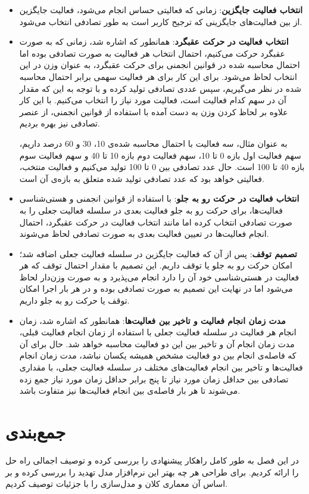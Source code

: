 \begin{itemize}
\item \textbf{انتخاب فعالیت جایگزین}: زمانی که فعالیتی حساس انجام می‌شود، فعالیت جایگزین از بین فعالیت‌های جایگزینی که ترجیح کاربر است به طور تصادفی انتخاب می‌شود.
\item \textbf{انتخاب فعالیت در حرکت عقبگرد}: همانطور که اشاره شد، زمانی که به صورت عقبگرد حرکت می‌کنیم، احتمال انتخاب هر فعالیت به صورت تصادفی بوده اما احتمال محاسبه شده در قوانین انجمنی برای حرکت عقبگرد، به عنوان وزن در این انتخاب لحاظ می‌شود. برای این کار برای هر فعالیت سهمی برابر احتمال محاسبه شده در نظر می‌گیریم، سپس عددی تصادفی تولید کرده و با توجه به این که مقدار آن در سهم کدام فعالیت است، فعالیت مورد نیاز را انتخاب می‌کنیم. با این کار علاوه بر لحاظ کردن وزن به دست آمده با استفاده از قوانین انجمنی، از عنصر تصادفی نیز بهره بردیم.

به عنوان مثال، سه فعالیت با احتمال محاسبه شده‌ی 10، 30 و 60 درصد داریم، سهم فعالیت اول بازه 0 تا 10، سهم فعالیت دوم بازه 10 تا 40 و سهم فعالیت سوم بازه 40 تا 100 است. حال عدد تصادفی بین 0 تا 100 تولید می‌کنیم و فعالیت منتخب، فعالیتی خواهد بود که عدد تصادفی تولید شده متعلق به بازه‌ی آن است.
\item \textbf{انتخاب فعالیت در حرکت رو به جلو}: با استفاده از قوانین انجمنی و هستی‌شناسی فعالیت‌ها، برای حرکت رو به جلو فعالیت بعدی در سلسله فعالیت جعلی را به صورت تصادفی انتخاب کرده اما مانند انتخاب فعالیت در حرکت عقبگرد، احتمال انجام فعالیت‌ها در تعیین فعالیت بعدی به صورت تصادفی لحاظ می‌شوند.
\item \textbf{تصمیم توقف}: پس از آن که فعالیت جایگزین در سلسله فعالیت جعلی اضافه شد؛ امکان حرکت رو به جلو یا توقف داریم. این تصمیم با مقدار احتمال توقف که هر فعالیت در هستی‌شناسی خود آن را دارد انجام می‌پذیرد و به صورت وزن‌دار لحاظ می‌شود اما در نهایت این تصمیم به صورت تصادفی بوده و در هر بار اجرا امکان توقف یا حرکت رو به جلو داریم.
\item \textbf{مدت زمان انجام فعالیت و تاخیر بین فعالیت‌ها}: همانطور که اشاره شد، زمان انجام هر فعالیت در سلسله فعالیت جعلی با استفاده از زمان انجام فعالیت قبلی، مدت زمان انجام آن و تاخیر بین این دو فعالیت محاسبه خواهد شد. حال برای آن که فاصله‌ی انجام بین دو فعالیت مشخص همیشه یکسان نباشد، مدت زمان انجام فعالیت‌ها و تاخیر بین انجام فعالیت‌های مختلف در سلسله فعالیت جعلی، با مقداری تصادفی بین حداقل زمان مورد نیاز تا پنج برابر حداقل زمان مورد نیاز جمع زده می‌شوند تا هر بار فاصله‌ی بین انجام فعالیت‌ها نیز متفاوت باشد.
‌\end{itemize}

\section{جمع‌بندی}

در این فصل به طور کامل راهکار پیشنهادی را بررسی کرده و توصیف اجمالی راه حل را ارائه کردیم. برای طراحی هر چه بهتر این نرم‌افزار مدل تهدید را بررسی کرده و بر اساس آن معماری کلان و مدل‌سازی را با جزئیات توصیف کردیم.
